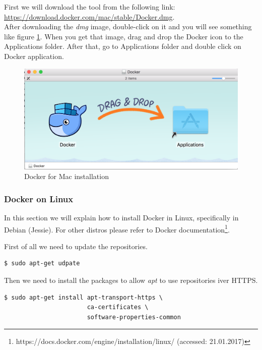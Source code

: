 First we will download the tool from the following link: \url{https://download.docker.com/mac/stable/Docker.dmg}.\\

After downloading the \textit{dmg} image, double-click on it and you will see something like figure \ref{fig:docker-mac-01}. When you get that image, drag and drop the Docker icon to the Applications folder. After that, go to Applications folder and double click on Docker application.

\begin{figure}[ht]
	\centering
    \includegraphics[width=\textwidth]{grafiken/docker-01}
    \caption{Docker for Mac installation}
    \label{fig:docker-mac-01}
\end{figure}

\subsubsection{Docker on Linux}
In this section we will explain how to install Docker in Linux, specifically in Debian (Jessie). For other distros please refer to Docker documentation\footnote{https://docs.docker.com/engine/installation/linux/ (accessed: 21.01.2017)}.

First of all we need to update the repositories.

\begin{verbatim}
$ sudo apt-get udpate
\end{verbatim}

Then we need to install the packages to allow \textit{apt} to use repositories iver HTTPS.

\begin{verbatim}
$ sudo apt-get install apt-transport-https \
                       ca-certificates \
                       software-properties-common
\end{verbatim}

